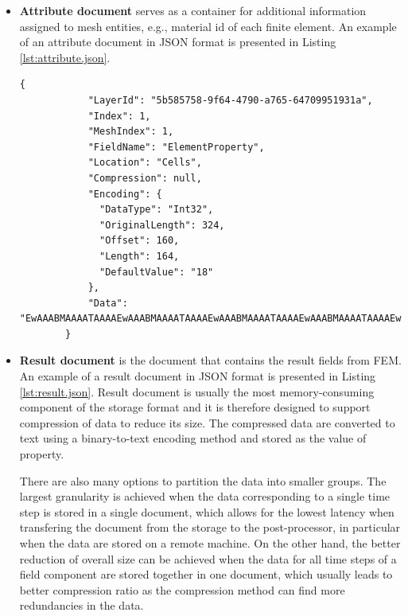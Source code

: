 \begin{itemize}
    \vspace{5mm}

    \item \textbf{Attribute document} serves as a container for additional information assigned to mesh entities, e.g., material id of each finite element. An example of an attribute document in JSON format is presented in Listing \ref{lst:attribute.json}.

    \begin{lstlisting}[style=json,caption=Example of attribute.json document.,label=lst:attribute.json]
        {
            "LayerId": "5b585758-9f64-4790-a765-64709951931a",
            "Index": 1,
            "MeshIndex": 1,
            "FieldName": "ElementProperty",
            "Location": "Cells",
            "Compression": null,
            "Encoding": {
              "DataType": "Int32",
              "OriginalLength": 324,
              "Offset": 160,
              "Length": 164,
              "DefaultValue": "18"
            },
            "Data": "EwAAABMAAAATAAAAEwAAABMAAAATAAAAEwAAABMAAAATAAAAEwAAABMAAAATAAAAEwAAABMAAAATAAAAEwAAAB..."
        }
    \end{lstlisting}

    \vspace{5mm}

    \item \textbf{Result document} is the document that contains the result fields from FEM. An example of a result document in JSON format is presented in Listing \ref{lst:result.json}. Result document is usually the most memory-consuming component of the storage format and it is therefore designed to support compression of data to reduce its size. The compressed data are converted to text using a binary-to-text encoding method and stored as the value of  property.

    There are also many options to partition the data into smaller groups. The largest granularity is achieved when the data corresponding to a single time step is stored in a single document, which allows for the lowest latency when transfering the document from the storage to the post-processor, in particular when the data are stored on a remote machine. On the other hand, the better reduction of overall size can be achieved when the data for all time steps of a field component are stored together in one document, which usually leads to better compression ratio as the compression method can find more redundancies in the data.


\end{itemize}
